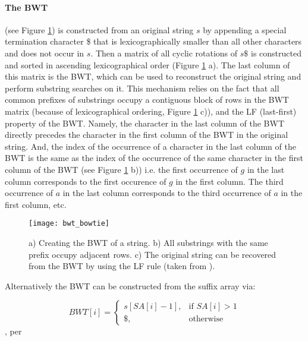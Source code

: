 \paragraph{The BWT} (see Figure \ref{fig:bwt_bowtie}) is constructed from an original string $s$ by appending a special termination character \$ that is lexicographically smaller than all other characters and does not occur in $s$. Then a matrix of all cyclic rotations of $s\$$ is constructed and sorted in ascending lexicographical order (Figure \ref{fig:bwt_bowtie} a). The last column of this matrix is the BWT, which can be used to reconstruct the original string and perform substring searches on it. This mechanism relies on the fact that all common prefixes of substrings occupy a contiguous block of rows in the BWT matrix (because of lexicographical ordering, Figure \ref{fig:bwt_bowtie} c)), and the LF (last-first) property of the BWT. Namely, the character in the last column of the BWT directly precedes the character in the first column of the BWT in the original string. And, the index of the occurrence of a character in the last column of the BWT is the same as the index of the occurrence of the same character in the first column of the BWT (see Figure \ref{fig:bwt_bowtie} b)) i.e. the first occurrence of $g$ in the last column corresponds to the first occurence of $g$ in the first column. The third occurrence of $a$ in the last column corresponds to the third occurrence of $a$ in the first column, etc.

\begin{figure}[h!]
    \texttt{[image: bwt\_bowtie]}
    \centering
    \caption {a) Creating the BWT of a string. b) All substrings with the same prefix occupy adjacent rows. c) The original string can be recovered from the BWT by using the LF rule (taken from \autocite{langmead2009ultrafast}).}
    \label{fig:bwt_bowtie}
\end{figure}

Alternatively the BWT can be constructed from the suffix array via:

\begin{equation}
    BWT[i] = \begin{cases}
        s[SA[i] - 1],& \text{if } SA[i] > 1\\
        \$,& \text{otherwise}
    \end{cases}
\end{equation}, per \autocite{simpson2010efficient}

